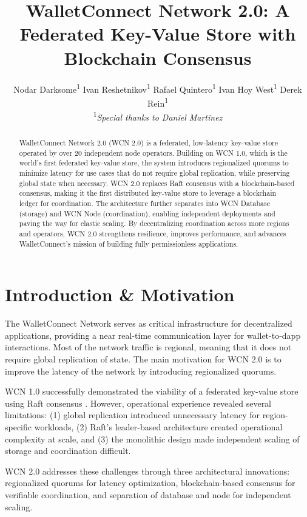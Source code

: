 \documentclass[10pt,twocolumn]{article}
\title{\textbf{WalletConnect Network 2.0: A Federated Key-Value Store with Blockchain Consensus}}
\author{
    Nodar Darksome\textsuperscript{1} \quad
    Ivan Reshetnikov\textsuperscript{1} \quad
    Rafael Quintero\textsuperscript{1} \quad
    Ivan Hoy West\textsuperscript{1} \quad
    Derek Rein\textsuperscript{1} \\[0.5em]
    \textsuperscript{1}\textit{Special thanks to Daniel Martinez}
}
\date{}
\begin{document}
\maketitle

\begin{abstract}
WalletConnect Network 2.0 (WCN 2.0) is a federated, low-latency key-value store operated by over 20 independent node operators.
Building on WCN 1.0, which is the world's first federated key-value store, the system introduces regionalized quorums to minimize latency for use cases that do not require global replication, while preserving global state when necessary. WCN 2.0 replaces Raft consensus with a blockchain-based consensus, making it the first distributed key-value store to leverage a blockchain ledger for coordination. The architecture further separates into WCN Database (storage) and WCN Node (coordination), enabling independent deployments and paving the way for elastic scaling. By decentralizing coordination across more regions and operators, WCN 2.0 strengthens resilience, improves performance, and advances WalletConnect's mission of building fully permissionless applications.
\end{abstract}

\section{Introduction \& Motivation}

The WalletConnect Network serves as critical infrastructure for decentralized applications, providing a near real-time communication layer for wallet-to-dapp interactions. Most of the network traffic is regional, meaning that it does not require global replication of state. The main motivation for WCN 2.0 is to improve the latency of the network by introducing regionalized quorums.

WCN 1.0 successfully demonstrated the viability of a federated key-value store using Raft consensus \cite{wcn1}. However, operational experience revealed several limitations: (1) global replication introduced unnecessary latency for region-specific workloads, (2) Raft's leader-based architecture created operational complexity at scale, and (3) the monolithic design made independent scaling of storage and coordination difficult.

WCN 2.0 addresses these challenges through three architectural innovations: regionalized quorums for latency optimization, blockchain-based consensus for verifiable coordination, and separation of database and node for independent scaling.
\end{document}
